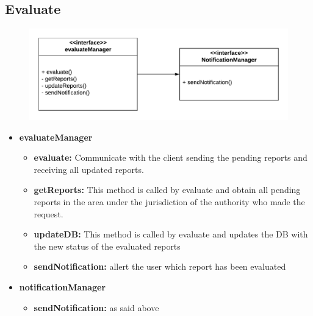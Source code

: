 \documentclass[12pt,a4paper]{report}
\begin{document}
			\subsection{Evaluate}
				\begin{figure}[H]
						\includegraphics[width = \textwidth, center]{evaluateInterface}
						\label{fig: interfaces}
				\end{figure}
				\begin{itemize}
						\item \textbf{evaluateManager}
						\begin{itemize}
							\item \textbf{evaluate:} Communicate with the client sending the pending reports and
								receiving all updated reports.
							\item \textbf{getReports:} This method is called by evaluate and obtain all pending
								reports in the area under the jurisdiction of the authority who made the request.
							\item \textbf{updateDB:} This method is called by evaluate and updates the DB with the
								new status of the evaluated reports
							\item \textbf{sendNotification:} allert the user which report has been evaluated
						\end{itemize}
						\item \textbf{notificationManager}
						\begin{itemize}
							\item \textbf{sendNotification:} as said above
						\end{itemize}
				\end{itemize}
\end{document}
